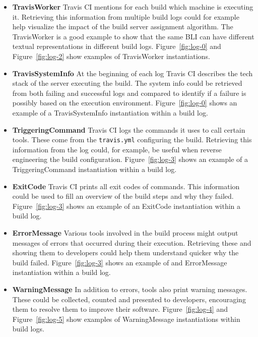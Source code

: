 \documentclass[\myrootdir/main.tex]{subfiles}
\begin{document}
\begin{itemize}
	\item \textbf{TravisWorker} Travis CI mentions for each build which machine is executing it.
	      Retrieving this information from multiple build logs could for example help visualize the impact of the build server assignment algorithm.
	      The TravisWorker is a good example to show that the same BLI can have different textual representations in different build logs.
	      Figure~\ref{fig:log-0} and Figure~\ref{fig:log-2} show examples of TravisWorker instantiations.

	\item \textbf{TravisSystemInfo} At the beginning of each log Travis CI describes the tech stack of the server executing the build.
	      The system info could be retrieved from both failing and successful logs and compared to identify if a failure is possibly based on the execution environment.
	      Figure~\ref{fig:log-0} shows an example of a TravisSystemInfo instantiation within a build log.

	\item \textbf{TriggeringCommand} Travis CI logs the commands it uses to call certain tools.
	      These come from the \texttt{travis.yml} configuring the build.
	      Retrieving this information from the log could, for example, be useful when reverse engineering the build configuration.
	      Figure~\ref{fig:log-3} shows an example of a TriggeringCommand instantiation within a build log.

	\item \textbf{ExitCode} Travis CI prints all exit codes of commands.
	      This information could be used to fill an overview of the build steps and why they failed.
	      Figure~\ref{fig:log-3} shows an example of an ExitCode instantiation within a build log.

	\item \textbf{ErrorMessage} Various tools involved in the build process might output messages of errors that occurred during their execution.
	      Retrieving these and showing them to developers could help them understand quicker why the build failed.
	      Figure~\ref{fig:log-3} shows an example of and ErrorMessage instantiation within a build log.

	\item \textbf{WarningMessage} In addition to errors, tools also print warning messages.
	      These could be collected, counted and presented to developers, encouraging them to resolve them to improve their software.
	      Figure~\ref{fig:log-4} and Figure~\ref{fig:log-5} show examples of WarningMessage instantiations within build logs.

\end{itemize}
\end{document}
